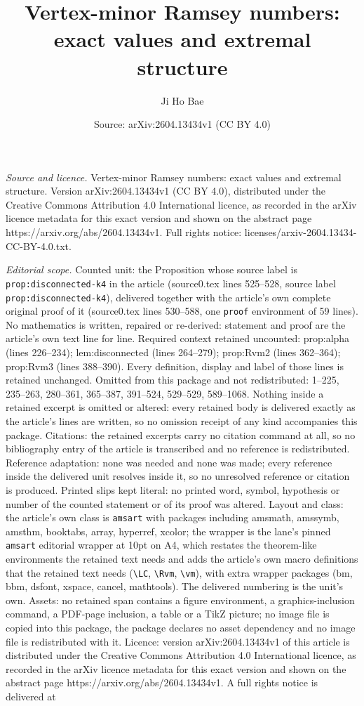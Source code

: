 \documentclass[10pt,a4paper]{amsart}
\title[Vertex-minor Ramsey numbers: exact values and extremal struc]{Vertex-minor Ramsey numbers: exact values and extremal structure}
\author{Ji Ho Bae}
\date{Source: arXiv:2604.13434v1 (CC BY 4.0)}
\begin{document}
\maketitle

\noindent\emph{Source and licence.} Vertex-minor Ramsey numbers: exact values and extremal structure. Version arXiv:2604.13434v1 (CC BY 4.0), distributed under the Creative Commons Attribution 4.0 International licence, as recorded in the arXiv licence metadata for this exact version and shown on the abstract page https://arxiv.org/abs/2604.13434v1. Full rights notice: licenses/arxiv-2604.13434-CC-BY-4.0.txt.\par\smallskip

\noindent\textit{Editorial scope.} Counted unit: the Proposition whose source label is \texttt{prop:disconnected-k4} in the article (source0.tex lines 525--528, source label \texttt{prop:disconnected-k4}), delivered together with the article's own complete original proof of it (source0.tex lines 530--588, one \texttt{proof} environment of 59 lines). No mathematics is written, repaired or re-derived: statement and proof are the article's own text line for line. Required context retained uncounted: prop:alpha (lines 226--234); lem:disconnected (lines 264--279); prop:Rvm2 (lines 362--364); prop:Rvm3 (lines 388--390). Every definition, display and label of those lines is retained unchanged. Omitted from this package and not redistributed: 1--225, 235--263, 280--361, 365--387, 391--524, 529--529, 589--1068. Nothing inside a retained excerpt is omitted or altered: every retained body is delivered exactly as the article's lines are written, so no omission receipt of any kind accompanies this package. Citations: the retained excerpts carry no citation command at all, so no bibliography entry of the article is transcribed and no reference is redistributed. Reference adaptation: none was needed and none was made; every reference inside the delivered unit resolves inside it, so no unresolved reference or citation is produced. Printed slips kept literal: no printed word, symbol, hypothesis or number of the counted statement or of its proof was altered. Layout and class: the article's own class is \texttt{amsart} with packages including amsmath, amssymb, amsthm, booktabs, array, hyperref, xcolor; the wrapper is the lane's pinned \texttt{amsart} editorial wrapper at 10pt on A4, which restates the theorem-like environments the retained text needs and adds the article's own macro definitions that the retained text needs (\texttt{\textbackslash LC}, \texttt{\textbackslash Rvm}, \texttt{\textbackslash vm}), with extra wrapper packages (bm, bbm, dsfont, xspace, cancel, mathtools). The delivered numbering is the unit's own. Assets: no retained span contains a figure environment, a graphics-inclusion command, a PDF-page inclusion, a table or a TikZ picture; no image file is copied into this package, the package declares no asset dependency and no image file is redistributed with it. Licence: version arXiv:2604.13434v1 of this article is distributed under the Creative Commons Attribution 4.0 International licence, as recorded in the arXiv licence metadata for this exact version and shown on the abstract page https://arxiv.org/abs/2604.13434v1. A full rights notice is delivered at 
\end{document}
